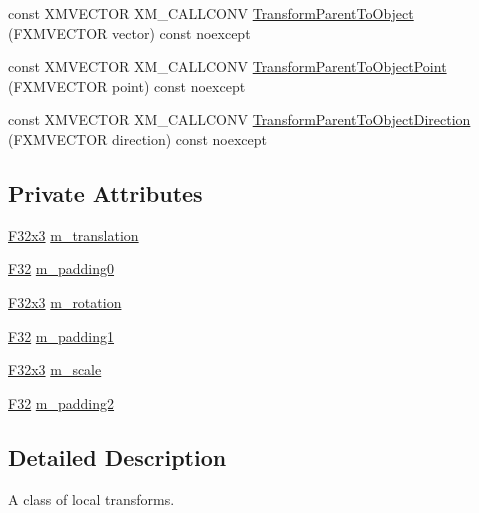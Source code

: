\begin{DoxyCompactItemize}
\item 
const X\+M\+V\+E\+C\+T\+OR X\+M\+\_\+\+C\+A\+L\+L\+C\+O\+NV \mbox{\hyperlink{classmage_1_1_local_transform_aee4c8c7b54e538a1448224bb36490d0a}{Transform\+Parent\+To\+Object}} (F\+X\+M\+V\+E\+C\+T\+OR vector) const noexcept
\item 
const X\+M\+V\+E\+C\+T\+OR X\+M\+\_\+\+C\+A\+L\+L\+C\+O\+NV \mbox{\hyperlink{classmage_1_1_local_transform_a869e0acb9947f74405bad09164182373}{Transform\+Parent\+To\+Object\+Point}} (F\+X\+M\+V\+E\+C\+T\+OR point) const noexcept
\item 
const X\+M\+V\+E\+C\+T\+OR X\+M\+\_\+\+C\+A\+L\+L\+C\+O\+NV \mbox{\hyperlink{classmage_1_1_local_transform_a237b0811672ffc8dd611e6a56af24c18}{Transform\+Parent\+To\+Object\+Direction}} (F\+X\+M\+V\+E\+C\+T\+OR direction) const noexcept
\end{DoxyCompactItemize}
\subsection*{Private Attributes}
\begin{DoxyCompactItemize}
\item 
\mbox{\hyperlink{namespacemage_a0fef5ab4e073c2d9ea876fefa3da4233}{F32x3}} \mbox{\hyperlink{classmage_1_1_local_transform_af467d4a331c7215cf016e31bd91c42db}{m\+\_\+translation}}
\item 
\mbox{\hyperlink{namespacemage_aa97e833b45f06d60a0a9c4fc22ae02c0}{F32}} \mbox{\hyperlink{classmage_1_1_local_transform_a408d86574aca8976ca123b992118c6f8}{m\+\_\+padding0}}
\item 
\mbox{\hyperlink{namespacemage_a0fef5ab4e073c2d9ea876fefa3da4233}{F32x3}} \mbox{\hyperlink{classmage_1_1_local_transform_ac4825a600646e0bb3db5a4699db5f5e1}{m\+\_\+rotation}}
\item 
\mbox{\hyperlink{namespacemage_aa97e833b45f06d60a0a9c4fc22ae02c0}{F32}} \mbox{\hyperlink{classmage_1_1_local_transform_a3b2b212788e819fb6ac46322c15e002e}{m\+\_\+padding1}}
\item 
\mbox{\hyperlink{namespacemage_a0fef5ab4e073c2d9ea876fefa3da4233}{F32x3}} \mbox{\hyperlink{classmage_1_1_local_transform_aca17d055c29e408606e199425bd2ee2a}{m\+\_\+scale}}
\item 
\mbox{\hyperlink{namespacemage_aa97e833b45f06d60a0a9c4fc22ae02c0}{F32}} \mbox{\hyperlink{classmage_1_1_local_transform_ad293dda4a1c7bfec90267915937aec90}{m\+\_\+padding2}}
\end{DoxyCompactItemize}


\subsection{Detailed Description}
A class of local transforms. 

